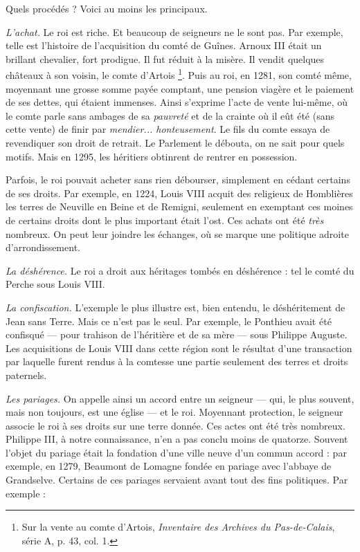 \documentclass[french,twoside]{book} %
\newcommand{\labelchar}[1]{{\color{rubric}\bf #1}}
\begin{document}
Quels procédés ? Voici au moins les principaux.\par
\bigbreak
\noindent \labelchar{a)} {\itshape L’achat.} Le roi est riche. Et beaucoup de seigneurs ne le sont pas. Par exemple, telle est l’histoire de l’acquisition du comté de Guînes. Arnoux III était un brillant chevalier, fort prodigue. Il fut réduit à la misère. Il vendit quelques châteaux à son voisin, le comte d’Artois \footnote{ Sur la vente au comte d’Artois, {\itshape Inventaire des Archives du Pas-de-Calais}, série A, p. 43, col. 1.}. Puis au roi, en 1281, son comté même, moyennant une grosse somme payée comptant, une pension viagère et le paiement de ses dettes, qui étaient immenses. Ainsi s’exprime l’acte de vente lui-même, où le comte parle sans ambages de sa \emph{pauvreté} et de la crainte où il eût été (sans cette vente) de finir par \emph{mendier... honteusement}. Le fils du comte essaya de revendiquer son droit de retrait. Le Parlement le débouta, on ne sait pour quels motifs. Mais en 1295, les héritiers obtinrent de rentrer en possession.\par
Parfois, le roi pouvait acheter sans rien débourser, simplement en cédant certains de ses droits. Par exemple, en 1224, Louis VIII acquit des religieux de Homblières les terres de Neuville en Beine et de Remigni, seulement en exemptant ces moines de certains droits dont le plus important était l’ost. Ces achats ont été {\itshape très} nombreux. On peut leur joindre les échanges, où se marque une politique adroite d’arrondissement.\par
\bigbreak
\noindent \labelchar{b)} {\itshape La déshérence.} Le roi a droit aux héritages tombés en déshérence : tel le comté du Perche sous Louis VIII.\par
\bigbreak
\noindent \labelchar{c)} {\itshape La confiscation.} L’exemple le plus illustre est, bien entendu, le déshéritement de Jean sans Terre. Mais ce n’est pas le seul. Par exemple, le Ponthieu avait été confisqué — pour trahison de l’héritière et de sa mère — sous Philippe Auguste. Les acquisitions de Louis VIII dans cette région sont le résultat d’une transaction par laquelle furent rendus à la comtesse une partie seulement des terres et droits paternels.\par
\bigbreak
\noindent \labelchar{d)} {\itshape Les pariages.} On appelle ainsi un accord entre un seigneur — qui, le plus souvent, mais non toujours, est une église — et le roi. Moyennant protection, le seigneur associe le roi à ses droits sur une terre donnée. Ces actes ont été très nombreux. Philippe III, à notre connaissance, n’en a pas conclu moins de quatorze. Souvent l’objet du pariage était la fondation d’une ville neuve d’un commun accord : par exemple, en 1279, Beaumont de Lomagne fondée en pariage avec l’abbaye de Grandselve. Certains de ces pariages servaient avant tout des fins politiques. Par exemple :\par
\end{document}
